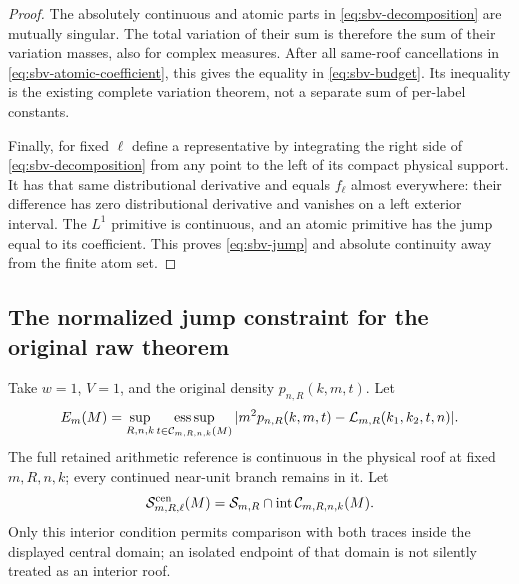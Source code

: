 \begin{proof}
The absolutely continuous and atomic parts in
\eqref{eq:sbv-decomposition} are mutually singular.  The total
variation of their sum is therefore the sum of their variation
masses, also for complex measures.  After all same-roof
cancellations in \eqref{eq:sbv-atomic-coefficient}, this gives
the equality in \eqref{eq:sbv-budget}.  Its inequality is the
existing complete variation theorem, not a separate sum of
per-label constants.

Finally, for fixed $\ell$ define a representative by integrating
the right side of \eqref{eq:sbv-decomposition} from any point to
the left of its compact physical support.  It has that same
distributional derivative and equals $f_\ell$ almost everywhere:
their difference has zero distributional derivative and vanishes
on a left exterior interval.  The $L^1$ primitive is continuous,
and an atomic primitive has the jump equal to its coefficient.
This proves \eqref{eq:sbv-jump} and absolute continuity away
from the finite atom set.
\end{proof}

\subsection{The normalized jump constraint for the original raw theorem}

Take $w=1$, $V=1$, and the original density $p_{n,R}(k,m,t)$.
Let
\[
 E_m(M)=\sup_{R,n,k}\operatorname*{ess\,sup}_{t\in\mathcal C_{m,R,n,k}(M)}
       |m^2p_{n,R}(k,m,t)-\mathcal L_{m,R}(k_1,k_2,t,n)|.
\]
The full retained arithmetic reference is continuous in the physical
roof at fixed $m,R,n,k$; every continued near-unit branch remains
in it.  Let
\[
 \mathcal S_{m,R,\ell}^{\rm cen}(M)
    =\mathcal S_{m,R}\cap
                \operatorname{int}\mathcal C_{m,R,n,k}(M).
\]
Only this interior condition permits comparison with both traces
inside the displayed central domain; an isolated endpoint of that
domain is not silently treated as an interior roof.

